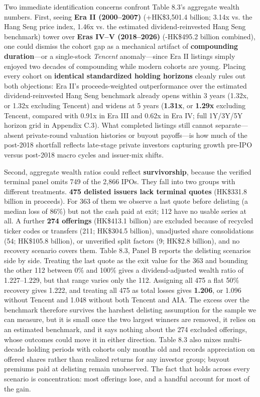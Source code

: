 \documentclass[11pt,letterpaper]{article}
\begin{document}
Two immediate identification concerns confront Table 8.3's aggregate wealth numbers. First, seeing \textbf{Era II (2000–2007)} (+HK\$3,501.4 billion; 3.14x vs. the Hang Seng price index, 1.46x vs. the estimated dividend-reinvested Hang Seng benchmark) tower over \textbf{Eras IV–V (2018–2026)} (-HK\$495.2 billion combined), one could dismiss the cohort gap as a mechanical artifact of \textbf{compounding duration}—or a single-stock \textit{Tencent} anomaly—since Era II listings simply enjoyed two decades of compounding while modern cohorts are young. Placing every cohort on \textbf{identical standardized holding horizons} cleanly rules out both objections: Era II's proceeds-weighted outperformance over the estimated dividend-reinvested Hang Seng benchmark already opens within 3 years (1.32x, or 1.32x excluding Tencent) and widens at 5 years (\textbf{1.31x}, or \textbf{1.29x} excluding Tencent, compared with 0.91x in Era III and 0.62x in Era IV; full 1Y/3Y/5Y horizon grid in Appendix C.3). What completed listings still cannot separate—absent private-round valuation histories or buyout payoffs—is how much of the post-2018 shortfall reflects late-stage private investors capturing growth pre-IPO versus post-2018 macro cycles and issuer-mix shifts.

Second, aggregate wealth ratios could reflect \textbf{survivorship}, because the verified terminal panel omits 749 of the 2,866 IPOs. They fall into two groups with different treatments. \textbf{475 delisted issuers lack terminal quotes} (HK\$331.8 billion in proceeds). For 363 of them we observe a last quote before delisting (a median loss of 86\%) but not the cash paid at exit; 112 have no usable series at all. A further \textbf{274 offerings} (HK\$413.1 billion) are excluded because of recycled ticker codes or transfers (211; HK\$304.5 billion), unadjusted share consolidations (54; HK\$105.8 billion), or unverified split factors (9; HK\$2.8 billion), and no recovery scenario covers them. Table 8.3, Panel B reports the delisting scenarios side by side. Treating the last quote as the exit value for the 363 and bounding the other 112 between 0\% and 100\% gives a dividend-adjusted wealth ratio of 1.227–1.229, but that range varies only the 112. Assigning all 475 a flat 50\% recovery gives 1.222, and treating all 475 as total losses gives \textbf{1.206}, or 1.096 without Tencent and 1.048 without both Tencent and AIA. The excess over the benchmark therefore survives the harshest delisting assumption for the sample we can measure, but it is small once the two largest winners are removed, it relies on an estimated benchmark, and it says nothing about the 274 excluded offerings, whose outcomes could move it in either direction. Table 8.3 also mixes multi-decade holding periods with cohorts only months old and records appreciation on offered shares rather than realized returns for any investor group; buyout premiums paid at delisting remain unobserved. The fact that holds across every scenario is concentration: most offerings lose, and a handful account for most of the gain.
\end{document}
